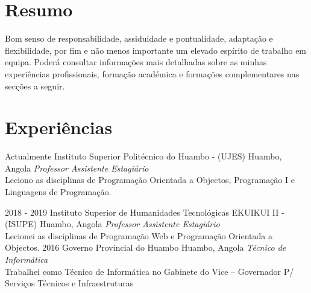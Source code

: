 \divider
\section{Resumo}
  \vspace{-0.2cm}
  
  Bom senso de responsabilidade, assiduidade e pontualidade, adaptação e flexibilidade, por fim e não menos importante um elevado espírito de trabalho em equipa. Poderá consultar informações mais detalhadas sobre as minhas experiências profissionais, formação académica e formações complementares nas secções a seguir.\\
  \divider

\section{Experiências}

\begin{entrada}

\lista
  {Actualmente}
  {Instituto Superior Politécnico do Huambo - (UJES)}
  {Huambo, Angola}
  {\textsf{\emph{Professor Assistente Estagiário}}\\
  \small{Leciono as disciplinas de Programação Orientada a Objectos}, Programação I e Linguagens de Programação.}

\lista
  {2018 - 2019}
  {Instituto Superior de Humanidades Tecnológicas EKUIKUI II - (ISUPE)}
  {Huambo, Angola}
  {\textsf{\emph{Professor Assistente Estagiário}}\\
  \small{Lecionei as disciplinas de Programação Web e Programação Orientada a Objectos.}}
\lista
  {2016}
  {Governo Provincial do Huambo}
  {Huambo, Angola}
  {\textsf{\emph{Técnico de Informática}}\\
  \small{Trabalhei como Técnico de Informática no Gabinete do Vice – Governador P/ Serviços Técnicos e Infraestruturas}}



\end{entrada}

